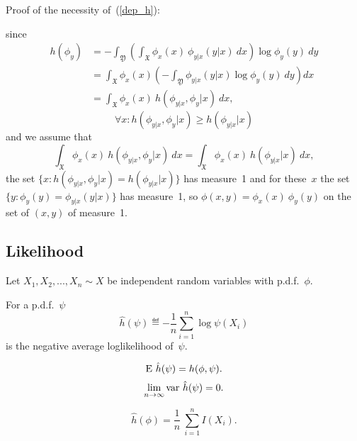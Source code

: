 \documentclass[10pt,a4paper]{article}
\theoremstyle{plain} \newtheorem{Lem}{Lemma}
\begin{document}
Proof of the necessity of~(\ref{dep_h}): \par
since
\begin{equation}
\begin{split}
 h(\phi_y) &= - \int_{\mathfrak Y} \left(\int_{\mathfrak X} \phi_x(x) \ \phi_{y|x}(y|x) \ dx \right) \log \phi_y(y) \ dy \\
           &= \int_{\mathfrak X} \phi_x(x) \left( - \int_{\mathfrak Y} \phi_{y|x}(y|x) \log \phi_y(y) \ dy \right) dx \\
           &= \int_{\mathfrak X} \phi_x(x) \ h(\phi_{y|x}, \phi_y|x) \ dx,
\end{split}
\end{equation}
$$ \forall x :  h(\phi_{y|x}, \phi_y|x) \ge h(\phi_{y|x}|x) $$
and we assume that
$$ \int_{\mathfrak X} \phi_x(x) \ h(\phi_{y|x}, \phi_y|x) \ dx = \int_{\mathfrak X} \phi_x(x) \ h(\phi_{y|x}|x) \ dx, $$
the set $\{x: h(\phi_{y|x}, \phi_y|x) = h(\phi_{y|x}|x) \}$
has measure~1 and for these~$x$ the set $\{y: \phi_y(y) = \phi_{y|x}(y|x)\}$ has measure~1,
so $\phi(x,y) = \phi_x(x) \ \phi_y(y)$ on the set of $(x,y)$ of measure~1.
\QED


\subsection{Likelihood}
Let $X_1, X_2, ..., X_n \sim X$ be independent random variables with p.d.f.~$\phi$.

For a p.d.f.~$\psi$
$$ \hat h(\psi) \eqdef - \frac 1 n \sum_{i=1}^n \log \psi(X_i) $$
is the negative average loglikelihood of~$\psi$.

$$ \mathrm E \  \hat h(\psi) = h(\phi,\psi). $$
$$ \lim_{n \to \infty} \mathrm {var} \  \hat h(\psi) = 0. $$

$$ \hat h (\phi) = \frac 1 n \ \sum_{i=1}^n I(X_i). $$
\end{document}
